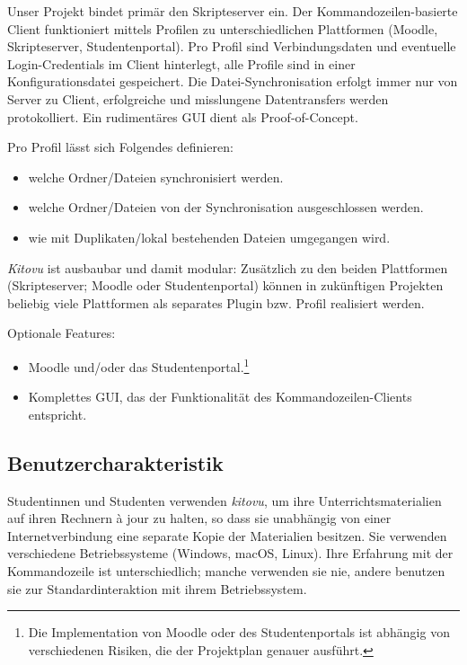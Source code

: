 \documentclass[a4paper]{article}
\begin{document}
Unser Projekt bindet primär den Skripteserver ein. Der Kommandozeilen-basierte Client funktioniert mittels Profilen zu unterschiedlichen Plattformen (Moodle, Skripteserver, Studentenportal). Pro Profil sind Verbindungsdaten und eventuelle Login-Credentials im Client hinterlegt, alle Profile sind in einer Konfigurationsdatei gespeichert. Die Datei-Synchronisation erfolgt immer nur von Server zu Client, erfolgreiche und misslungene Datentransfers werden protokolliert. Ein rudimentäres GUI dient als Proof-of-Concept.

Pro Profil lässt sich Folgendes definieren:

\begin{itemize}
	\item welche Ordner/Dateien synchronisiert werden.
	\item welche Ordner/Dateien von der Synchronisation ausgeschlossen werden.
	\item wie mit Duplikaten/lokal bestehenden Dateien umgegangen wird.
\end{itemize}

\emph{Kitovu} ist ausbaubar und damit modular: Zusätzlich zu den beiden Plattformen (Skripteserver; Moodle oder Studentenportal) können in zukünftigen Projekten beliebig viele Plattformen als separates Plugin bzw. Profil realisiert werden.

Optionale Features:

\begin{itemize}
	\item Moodle und/oder das Studentenportal.\footnote{Die Implementation von Moodle oder des Studentenportals ist abhängig von verschiedenen Risiken, die der Projektplan genauer ausführt.} 
	\item Komplettes GUI, das der Funktionalität des Kommandozeilen-Clients entspricht.
\end{itemize}

\subsection{Benutzercharakteristik}
Studentinnen und Studenten verwenden \emph{kitovu}, um ihre Unterrichtsmaterialien auf ihren Rechnern à jour zu halten, so dass sie unabhängig von einer Internetverbindung eine separate Kopie der Materialien besitzen. Sie verwenden verschiedene Betriebssysteme (Windows, macOS, Linux). Ihre Erfahrung mit der Kommandozeile ist unterschiedlich; manche verwenden sie nie, andere benutzen sie zur Standardinteraktion mit ihrem Betriebssystem.
\end{document}
